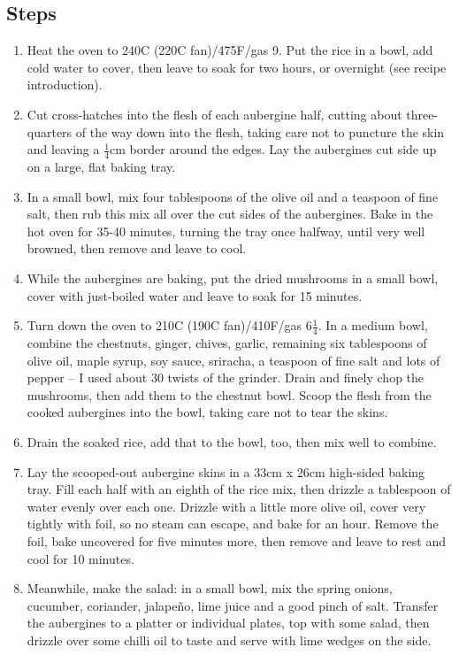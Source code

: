 \documentclass{book}
\begin{document}
\subsection*{Steps}
\begin{enumerate}
\item Heat the oven to 240C (220C fan)/475F/gas 9. Put the rice in a bowl, add cold water to cover, then leave to soak for two hours, or overnight (see recipe introduction).
\item Cut cross-hatches into the flesh of each aubergine half, cutting about three-quarters of the way down into the flesh, taking care not to puncture the skin and leaving a $\frac{1}{4}$cm border around the edges. Lay the aubergines cut side up on a large, flat baking tray.
\item In a small bowl, mix four tablespoons of the olive oil and a teaspoon of fine salt, then rub this mix all over the cut sides of the aubergines. Bake in the hot oven for 35-40 minutes, turning the tray once halfway, until very well browned, then remove and leave to cool.
\item While the aubergines are baking, put the dried mushrooms in a small bowl, cover with just-boiled water and leave to soak for 15 minutes.
\item Turn down the oven to 210C (190C fan)/410F/gas 6$\frac{1}{4}$. In a medium bowl, combine the chestnuts, ginger, chives, garlic, remaining six tablespoons of olive oil, maple syrup, soy sauce, sriracha, a teaspoon of fine salt and lots of pepper – I used about 30 twists of the grinder. Drain and finely chop the mushrooms, then add them to the chestnut bowl. Scoop the flesh from the cooked aubergines into the bowl, taking care not to tear the skins. 
\item Drain the soaked rice, add that to the bowl, too, then mix well to combine.
\item Lay the scooped-out aubergine skins in a 33cm x 26cm high-sided baking tray. Fill each half with an eighth of the rice mix, then drizzle a tablespoon of water evenly over each one. Drizzle with a little more olive oil, cover very tightly with foil, so no steam can escape, and bake for an hour. Remove the foil, bake uncovered for five minutes more, then remove and leave to rest and cool for 10 minutes.
\item Meanwhile, make the salad: in a small bowl, mix the spring onions, cucumber, coriander, jalapeño, lime juice and a good pinch of salt. Transfer the aubergines to a platter or individual plates, top with some salad, then drizzle over some chilli oil to taste and serve with lime wedges on the side.
\end{enumerate}
\newpage
\end{document}
